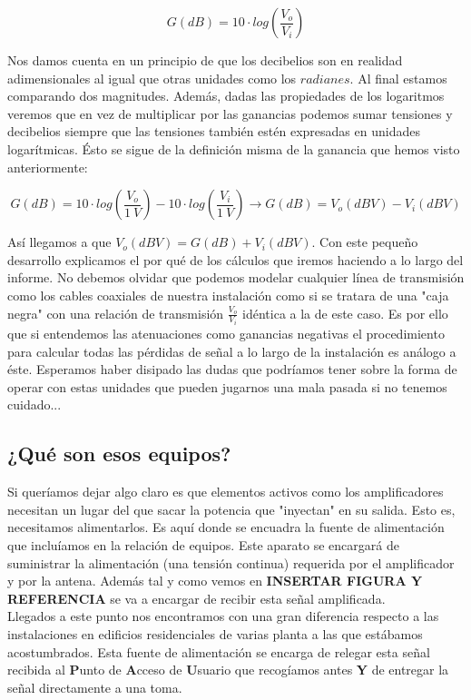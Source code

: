 \documentclass{article}[12 pt]
\begin{document}
			$$G(dB) = 10 \cdot log(\frac{V_o}{V_i})$$

			Nos damos cuenta en un principio de que los decibelios son en realidad adimensionales al igual que otras unidades como los $radianes$. Al final estamos comparando dos magnitudes. Además, dadas las propiedades de los logaritmos veremos que en vez de multiplicar por las ganancias podemos sumar tensiones y decibelios siempre que las tensiones también estén expresadas en unidades logarítmicas. Ésto se sigue de la definición misma de la ganancia que hemos visto anteriormente:

			$$G(dB) = 10 \cdot log(\frac{V_o}{1\ V}) - 10 \cdot log(\frac{V_i}{1\ V}) \rightarrow G(dB) = V_o(dBV) - V_i(dBV)$$

			Así llegamos a que $V_o(dBV) = G(dB) + V_i(dBV)$. Con este pequeño desarrollo explicamos el por qué de los cálculos que iremos haciendo a lo largo del informe. No debemos olvidar que podemos modelar cualquier línea de transmisión como los cables coaxiales de nuestra instalación como si se tratara de una "caja negra" con una relación de transmisión $\frac{V_o}{V_i}$ idéntica a la de este caso. Es por ello que si entendemos las atenuaciones como ganancias negativas el procedimiento para calcular todas las pérdidas de señal a lo largo de la instalación es análogo a éste. Esperamos haber disipado las dudas que podríamos tener sobre la forma de operar con estas unidades que pueden jugarnos una mala pasada si no tenemos cuidado...\\

		\subsection{¿Qué son esos equipos?}
			Si queríamos dejar algo claro es que elementos activos como los amplificadores necesitan un lugar del que sacar la potencia que "inyectan" en su salida. Esto es, necesitamos alimentarlos. Es aquí donde se encuadra la fuente de alimentación que incluíamos en la relación de equipos. Este aparato se encargará de suministrar la alimentación (una tensión continua) requerida por el amplificador y por la antena. Además tal y como vemos en \textbf{INSERTAR FIGURA Y REFERENCIA} se va a encargar de recibir esta señal amplificada.\\

			Llegados a este punto nos encontramos con una gran diferencia respecto a las instalaciones en edificios residenciales de varias planta a las que estábamos acostumbrados. Esta fuente de alimentación se encarga de relegar esta señal recibida al \textbf{P}unto de \textbf{A}cceso de \textbf{U}suario que recogíamos antes \textbf{Y} de entregar la señal directamente a una toma.\\
\end{document}
